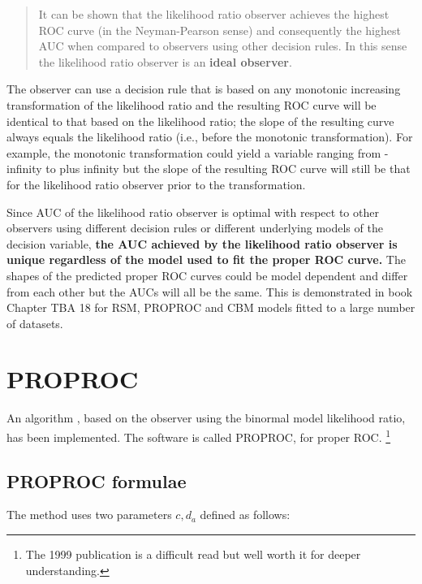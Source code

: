 \documentclass[
]{book}
\begin{document}
\begin{quote}
It can be shown that the likelihood ratio observer achieves the highest ROC curve (in the Neyman-Pearson sense) and consequently the highest AUC when compared to observers using other decision rules. In this sense the likelihood ratio observer is an \textbf{ideal observer}.
\end{quote}

The observer can use a decision rule that is based on any monotonic increasing transformation of the likelihood ratio and the resulting ROC curve will be identical to that based on the likelihood ratio; the slope of the resulting curve always equals the likelihood ratio (i.e., before the monotonic transformation). For example, the monotonic transformation could yield a variable ranging from -infinity to plus infinity but the slope of the resulting ROC curve will still be that for the likelihood ratio observer prior to the transformation.

Since AUC of the likelihood ratio observer is optimal with respect to other observers using different decision rules or different underlying models of the decision variable, \textbf{the AUC achieved by the likelihood ratio observer is unique regardless of the model used to fit the proper ROC curve.} The shapes of the predicted proper ROC curves could be model dependent and differ from each other but the AUCs will all be the same. This is demonstrated in book Chapter TBA 18 for RSM, PROPROC and CBM models fitted to a large number of datasets.

\hypertarget{proper-roc-models-proproc}{%
\section{PROPROC}\label{proper-roc-models-proproc}}

An algorithm \citep{metz1999proper}, based on the observer using the binormal model likelihood ratio, has been implemented. The software is called PROPROC, for proper ROC. \footnote{The 1999 publication is a difficult read but well worth it for deeper understanding.}

\hypertarget{proper-roc-models-proproc-formulae}{%
\subsection{PROPROC formulae}\label{proper-roc-models-proproc-formulae}}

The method uses two parameters \(c,d_a\) defined as follows:
\end{document}
